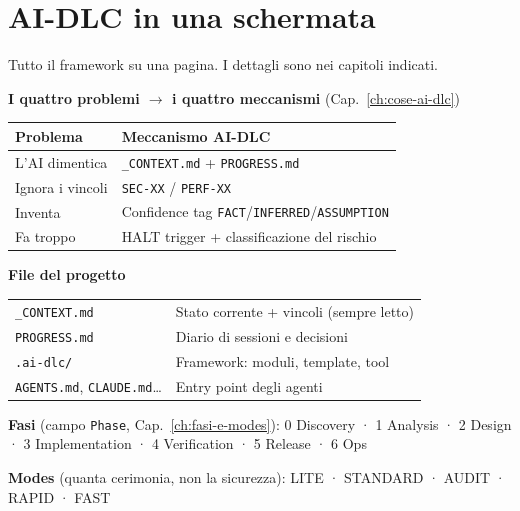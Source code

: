 
\chapter*{AI-DLC in una schermata}
\label{ch:cheatsheet}

Tutto il framework su una pagina. I dettagli sono nei capitoli indicati.

\vspace{0.4em}
\noindent\textbf{I quattro problemi $\rightarrow$ i quattro meccanismi} \hfill {\small (Cap.~\ref{ch:cose-ai-dlc})}

{\small
\begin{tabular}{ll}
\toprule
\textbf{Problema} & \textbf{Meccanismo AI-DLC} \\
\midrule
L'AI dimentica & \texttt{\_CONTEXT.md} + \texttt{PROGRESS.md} \\
Ignora i vincoli & \texttt{SEC-XX} / \texttt{PERF-XX} \\
Inventa & Confidence tag \texttt{FACT}/\texttt{INFERRED}/\texttt{ASSUMPTION} \\
Fa troppo & HALT trigger + classificazione del rischio \\
\bottomrule
\end{tabular}}

\vspace{0.6em}
\noindent\textbf{File del progetto}

{\small
\begin{tabular}{ll}
\toprule
\texttt{\_CONTEXT.md} & Stato corrente + vincoli (sempre letto) \\
\texttt{PROGRESS.md} & Diario di sessioni e decisioni \\
\texttt{.ai-dlc/} & Framework: moduli, template, tool \\
\texttt{AGENTS.md}, \texttt{CLAUDE.md}\dots & Entry point degli agenti \\
\bottomrule
\end{tabular}}

\vspace{0.6em}
\noindent\textbf{Fasi} (campo \texttt{Phase}, Cap.~\ref{ch:fasi-e-modes}): \quad
{\small 0 Discovery · 1 Analysis · 2 Design · 3 Implementation · 4 Verification · 5 Release · 6 Ops}

\vspace{0.3em}
\noindent\textbf{Modes} (quanta cerimonia, non la sicurezza): \quad
{\small LITE · STANDARD · AUDIT · RAPID · FAST}

